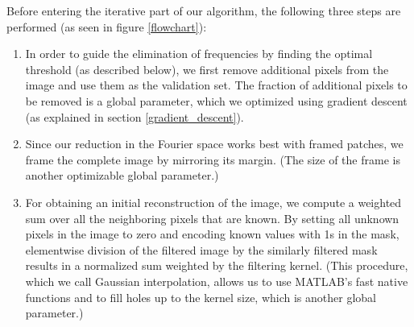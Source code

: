 \documentclass[10pt,conference,compsocconf]{IEEEtran}
\begin{document}
Before entering the iterative part of our algorithm, the following three steps are performed (as seen in figure \ref{flowchart}):
\begin{enumerate}
\item In order to guide the elimination of frequencies by finding the optimal threshold (as described below), we first remove additional pixels from the image and use them as the validation set. The fraction of additional pixels to be removed is a global parameter, which we optimized using gradient descent (as explained in section \ref{gradient_descent}).
\item Since our reduction in the Fourier space works best with framed patches, we frame the complete image by mirroring its margin. (The size of the frame is another optimizable global parameter.)
\item For obtaining an initial reconstruction of the image, we compute a weighted sum over all the neighboring pixels that are known. By setting all unknown pixels in the image to zero and encoding known values with 1s in the mask, elementwise division of the filtered image by the similarly filtered mask results in a normalized sum weighted by the filtering kernel. (This procedure, which we call Gaussian interpolation, allows us to use MATLAB's fast native functions and to fill holes up to the kernel size, which is another global parameter.)
\label{gaussian_interpolation}
\end{enumerate}
\end{document}

